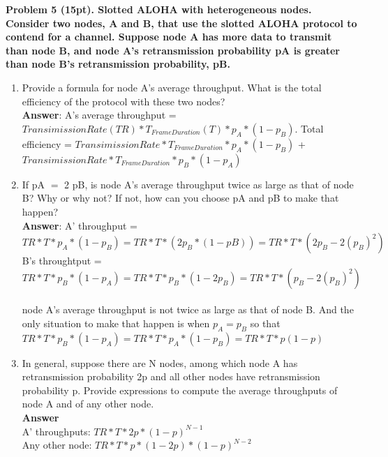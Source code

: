 \documentclass[12pt]{article}
\begin{document}
\noindent \textbf{Problem 5 (15pt). Slotted ALOHA with heterogeneous nodes. Consider two nodes, A and B,
that use the slotted ALOHA protocol to contend for a channel. Suppose node A has more data to
transmit than node B, and node A’s retransmission probability pA is greater than node B’s
retransmission probability, pB.\\}
\begin{enumerate}
\item Provide a formula for node A’s average throughput. What is the total efficiency of the
protocol with these two nodes?\\
\textbf{Answer}: A's average throughput = $ TransimissionRate(TR) * T_{FrameDuration}(T)*p_A * (1-p_B)$. Total efficiency = $TransimissionRate * T_{FrameDuration} * p_A * (1-p_B)$ + $TransimissionRate * T_{FrameDuration} * p_B * (1-p_A)$\\
\item If pA $=$ 2 pB, is node A’s average throughput twice as large as that of node B? Why or why not? If not, how can you choose pA and pB to make that happen?\\
\textbf{Answer}: A' throughput = $TR * T * p_A * (1-p_B) = TR * T * (2p_B*(1-pB)) = TR * T * (2p_B-2(p_B)^2)$\\
B's throughtput = $TR * T * p_B * (1-p_A) = TR * T *p_B*(1-2p_B) = TR * T *(p_B - 2(p_B)^2)$\\
\\
node A’s average throughput is not twice as large as that of node B. And the only situation to make that happen is when $p_A = p_B$ so that $TR * T * p_B * (1-p_A) = TR * T * p_A * (1-p_B) = TR*T*p(1-p)$
\item In general, suppose there are N nodes, among which node A has retransmission probability 2p and all other nodes have retransmission probability p. Provide expressions to compute the average throughputs of node A and of any other node.\\
\textbf{Answer}\\
A' throughputs: $TR*T * 2p * (1-p)^{N-1}$\\
Any other node: $TR*T * p*(1-2p)*(1-p)^{N-2}$
\end{enumerate}
\end{document}

